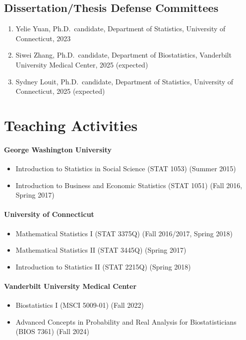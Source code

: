 \documentclass[12pt]{article}
\begin{document}
	\subsection*{Dissertation/Thesis Defense Committees}
	\begin{enumerate}
		\item Yelie Yuan, Ph.D.\ candidate, Department of 
		Statistics, University of Connecticut, 2023
		\item Siwei Zhang, Ph.D.\ candidate, Department of 
		Biostatistics, Vanderbilt University Medical Center, 2025 
		(expected)
		\item Sydney Louit, Ph.D.\ candidate, Department of 
		Statistics, University of Connecticut, 2025 (expected)
	\end{enumerate}
	
	
	\section*{Teaching Activities}
	\paragraph{George Washington University}
	\begin{itemize}
		\item Introduction to Statistics in Social Science (STAT 
		1053) (Summer 2015)
		\item Introduction to Business and Economic Statistics 
		(STAT 1051) (Fall 2016, Spring 2017)
	\end{itemize}
	\paragraph{University of Connecticut}
	\begin{itemize}
		\item Mathematical Statistics {\rm I} (STAT 3375Q) (Fall 
		2016/2017, Spring 2018)
		\item Mathematical Statistics {\rm II} (STAT 3445Q) (Spring 
		2017)
		\item Introduction to Statistics {\rm II} (STAT 2215Q) 
		(Spring 2018)
	\end{itemize}
	\paragraph{Vanderbilt University Medical Center}
	\begin{itemize}
		\item Biostatistics {\rm I} (MSCI 5009-01) (Fall 2022)
		\item Advanced Concepts in Probability and Real Analysis for 
		Biostatisticians (BIOS 7361) (Fall 2024)
	\end{itemize}
\end{document}
